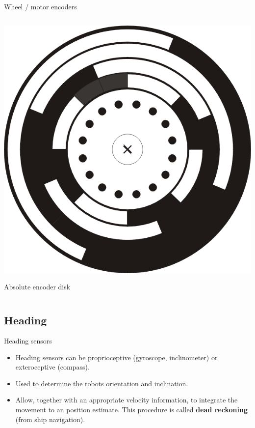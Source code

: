 \documentclass[compress]{beamer}
\begin{document}
\begin{frame}{Wheel / motor encoders}
\begin{columns}
\begin{column}{0.5\linewidth}
            \includegraphics[width=0.9\linewidth]{encoders4}

            Absolute encoder disk
        \end{column}
    \end{columns}


\end{frame}

\subsection{Heading}
\begin{frame}{Heading sensors}

    \begin{itemize}
        \item Heading sensors can be proprioceptive (gyroscope, inclinometer) or
              exteroceptive (compass).

        \item Used to determine the robots orientation and inclination.

        \item Allow, together with an appropriate velocity information, to integrate the
              movement to an position estimate. This procedure is called
              {\bf dead reckoning} (from ship navigation).

    \end{itemize}
\end{frame}
\end{document}
